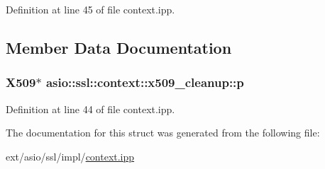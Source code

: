 Definition at line 45 of file context.\+ipp.



\subsection{Member Data Documentation}
\hypertarget{structasio_1_1ssl_1_1context_1_1x509__cleanup_a77efc01c744f2b1981030ffffdf73dd7}{}
\subsubsection[{p}]{\setlength{\rightskip}{0pt plus 5cm}X509$\ast$ asio\+::ssl\+::context\+::x509\+\_\+cleanup\+::p}\label{structasio_1_1ssl_1_1context_1_1x509__cleanup_a77efc01c744f2b1981030ffffdf73dd7}


Definition at line 44 of file context.\+ipp.



The documentation for this struct was generated from the following file\+:\begin{DoxyCompactItemize}
\item 
ext/asio/ssl/impl/\hyperlink{context_8ipp}{context.\+ipp}\end{DoxyCompactItemize}
